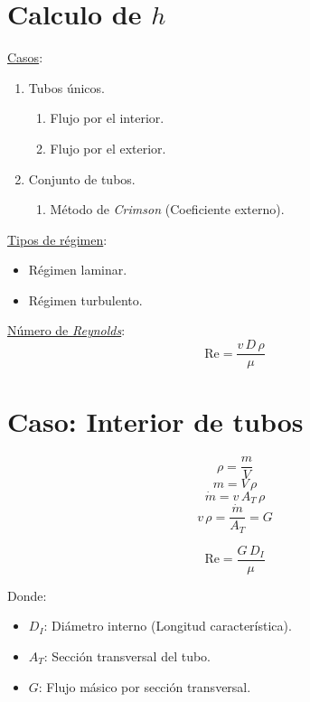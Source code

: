 \section{Calculo de $h$}
\underline{Casos}:
\begin{enumerate}
    \item Tubos únicos.
    \begin{enumerate}
        \item Flujo por el interior.
        \item Flujo por el exterior.
    \end{enumerate}
    \item Conjunto de tubos.
    \begin{enumerate}
        \item Método de \emph{Crimson} (Coeficiente externo).
    \end{enumerate}
\end{enumerate}

\underline{Tipos de régimen}:
\begin{itemize}
    \item Régimen laminar.
    \item Régimen turbulento.
\end{itemize}

\underline{Número de \emph{Reynolds}}:
\begin{equation}
    \text{Re} = \frac{v\,D\,\rho}{\mu}
\end{equation}

\section{Caso: Interior de tubos}
\begin{equation*}
    \rho = \frac{m}{V}
\end{equation*}
\begin{equation*}
    m = V\,\rho
\end{equation*}
\begin{equation*}
    \dot{m} = v\,A_T\,\rho
\end{equation*}
\begin{equation*}
    v\,\rho = \frac{\dot{m}}{A_T} = G
\end{equation*}

\begin{equation}
    \text{Re} = \frac{G\,D_I}{\mu}
\end{equation}

Donde:
\begin{itemize}
    \item $D_I$: Diámetro interno (Longitud característica).
    \item $A_T$: Sección transversal del tubo.
    \item $G$: Flujo másico por sección transversal.
\end{itemize}

